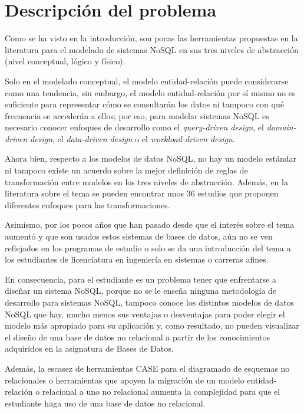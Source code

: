 \section{Descripción del problema}
Como se ha visto en la introducción, son pocas las herramientas propuestas en la literatura para el modelado de sistemas NoSQL en sus tres niveles de abstracción (nivel conceptual, lógico y físico).


Solo en el modelado conceptual, el modelo entidad-relación puede considerarse como una tendencia, sin embargo, el modelo entidad-relación por sí mismo no es suficiente para representar cómo se consultarán los datos ni tampoco con qué frecuencia se accederán a ellos; por eso, para modelar sistemas NoSQL es necesario conocer enfoques de desarrollo como el \textit{query-driven design}, el \textit{domain-driven design}, el \textit{data-driven design} o el \textit{workload-driven design}.


Ahora bien, respecto a los modelos de datos NoSQL, no hay un modelo estándar ni tampoco existe un acuerdo sobre la mejor definición de reglas de transformación entre modelos en los tres niveles de abstracción. Además, en la literatura sobre el tema se pueden encontrar unos 36 estudios que proponen diferentes enfoques para las transformaciones.


Asimismo, por los pocos años que han pasado desde que el interés sobre el tema aumentó y que son usados estos sistemas de bases de datos, aún no se ven reflejados en los programas de estudio o solo se da una introducción del tema a los estudiantes de licenciatura en ingeniería en sistemas o carreras afines. 


En consecuencia, para el estudiante es un problema tener que enfrentarse a diseñar un sistema NoSQL, porque no se le enseña ninguna metodología de desarrollo para sistemas NoSQL, tampoco conoce los distintos modelos de datos NoSQL que hay, mucho menos sus ventajas o desventajas para poder elegir el modelo más apropiado para su aplicación y, como resultado, no pueden visualizar el diseño de una base de datos no relacional a partir de los conocimientos adquiridos en la asignatura de Bases de Datos.


Además, la escasez de herramientas CASE para el diagramado de esquemas no relacionales o herramientas que apoyen la migración de un modelo entidad-relación o relacional a uno no relacional aumenta la complejidad para que el estudiante haga uso de una base de datos no relacional.
